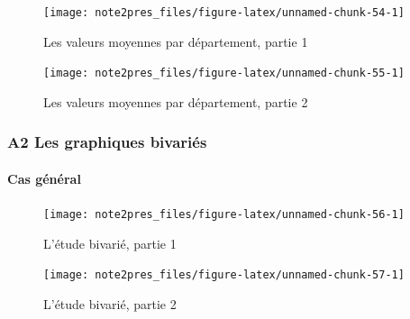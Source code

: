 \documentclass[11pt,]{article}
\let\oldparagraph\paragraph
\renewcommand{\paragraph}[1]{\oldparagraph{#1}\mbox{}}
\begin{document}
\FloatBarrier

\begin{figure}[!htbp]

{\centering \texttt{[image: note2pres\_files/figure-latex/unnamed-chunk-54-1]} 

}

\caption{Les valeurs moyennes par département, partie 1}\label{fig:unnamed-chunk-54}
\end{figure}

\FloatBarrier

\FloatBarrier

\begin{figure}[!htbp]

{\centering \texttt{[image: note2pres\_files/figure-latex/unnamed-chunk-55-1]} 

}

\caption{Les valeurs moyennes par département, partie 2}\label{fig:unnamed-chunk-55}
\end{figure}

\FloatBarrier

\newpage

\hypertarget{a2-les-graphiques-bivaries}{%
\subsubsection{A2 Les graphiques
bivariés}\label{a2-les-graphiques-bivaries}}

\hypertarget{cas-general}{%
\paragraph{Cas général}\label{cas-general}}

\FloatBarrier

\begin{figure}[!htbp]

{\centering \texttt{[image: note2pres\_files/figure-latex/unnamed-chunk-56-1]} 

}

\caption{L'étude bivarié, partie 1}\label{fig:unnamed-chunk-56}
\end{figure}

\FloatBarrier

\FloatBarrier

\begin{figure}[!htbp]

{\centering \texttt{[image: note2pres\_files/figure-latex/unnamed-chunk-57-1]} 

}

\caption{L'étude bivarié, partie 2}\label{fig:unnamed-chunk-57}
\end{figure}
\end{document}
